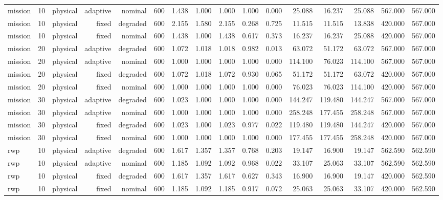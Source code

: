 \begin{tabular}{lrrrrrrrrrrrrrrr}
mission & 10 & physical & adaptive & nominal & 600 & 1.438 & 1.000 & 1.000 & 1.000 & 0.000 & 25.088 & 16.237 & 25.088 & 567.000 & 567.000 \\
mission & 10 & physical & fixed & degraded & 600 & 2.155 & 1.580 & 2.155 & 0.268 & 0.725 & 11.515 & 11.515 & 13.838 & 420.000 & 567.000 \\
mission & 10 & physical & fixed & nominal & 600 & 1.438 & 1.000 & 1.438 & 0.617 & 0.373 & 16.237 & 16.237 & 25.088 & 420.000 & 567.000 \\
mission & 20 & physical & adaptive & degraded & 600 & 1.072 & 1.018 & 1.018 & 0.982 & 0.013 & 63.072 & 51.172 & 63.072 & 567.000 & 567.000 \\
mission & 20 & physical & adaptive & nominal & 600 & 1.000 & 1.000 & 1.000 & 1.000 & 0.000 & 114.100 & 76.023 & 114.100 & 567.000 & 567.000 \\
mission & 20 & physical & fixed & degraded & 600 & 1.072 & 1.018 & 1.072 & 0.930 & 0.065 & 51.172 & 51.172 & 63.072 & 420.000 & 567.000 \\
mission & 20 & physical & fixed & nominal & 600 & 1.000 & 1.000 & 1.000 & 1.000 & 0.000 & 76.023 & 76.023 & 114.100 & 420.000 & 567.000 \\
mission & 30 & physical & adaptive & degraded & 600 & 1.023 & 1.000 & 1.000 & 1.000 & 0.000 & 144.247 & 119.480 & 144.247 & 567.000 & 567.000 \\
mission & 30 & physical & adaptive & nominal & 600 & 1.000 & 1.000 & 1.000 & 1.000 & 0.000 & 258.248 & 177.455 & 258.248 & 567.000 & 567.000 \\
mission & 30 & physical & fixed & degraded & 600 & 1.023 & 1.000 & 1.023 & 0.977 & 0.022 & 119.480 & 119.480 & 144.247 & 420.000 & 567.000 \\
mission & 30 & physical & fixed & nominal & 600 & 1.000 & 1.000 & 1.000 & 1.000 & 0.000 & 177.455 & 177.455 & 258.248 & 420.000 & 567.000 \\
rwp & 10 & physical & adaptive & degraded & 600 & 1.617 & 1.357 & 1.357 & 0.768 & 0.203 & 19.147 & 16.900 & 19.147 & 562.590 & 562.590 \\
rwp & 10 & physical & adaptive & nominal & 600 & 1.185 & 1.092 & 1.092 & 0.968 & 0.022 & 33.107 & 25.063 & 33.107 & 562.590 & 562.590 \\
rwp & 10 & physical & fixed & degraded & 600 & 1.617 & 1.357 & 1.617 & 0.627 & 0.343 & 16.900 & 16.900 & 19.147 & 420.000 & 562.590 \\
rwp & 10 & physical & fixed & nominal & 600 & 1.185 & 1.092 & 1.185 & 0.917 & 0.072 & 25.063 & 25.063 & 33.107 & 420.000 & 562.590 \\

\end{tabular}
